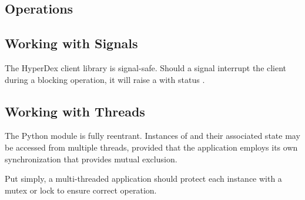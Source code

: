 \subsection{Operations}
\label{sec:api:python-client:ops}


\pagebreak

\subsection{Working with Signals}
\label{sec:api:python-client:signals}

The HyperDex client library is signal-safe.  Should a signal interrupt the
client during a blocking operation, it will raise a
 with status .

\subsection{Working with Threads}
\label{sec:api:python-client:threads}

The Python module is fully reentrant.  Instances of
 and their associated state may be accessed from
multiple threads, provided that the application employs its own synchronization
that provides mutual exclusion.

Put simply, a multi-threaded application should protect each 
instance with a mutex or lock to ensure correct operation.
